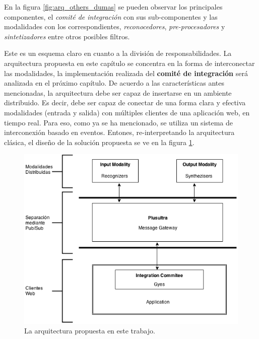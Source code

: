 En la figura \ref{fig:arq_others_dumas} se pueden observar los principales componentes, el \emph{comité de integración} con sus sub-componentes y las modalidades con los correspondientes, \emph{reconocedores}, \emph{pre-procesadores} y \emph{sintetizadores} entre otros posibles filtros.

Este es un esquema claro en cuanto a la división de responsabilidades. La arquitectura propuesta en este capítulo se concentra en la forma de interconectar las modalidades, la implementación realizada del \textbf{comité de integración} será analizada en el próximo capítulo.
De acuerdo a las características antes mencionadas, la arquitectura debe ser capaz de insertarse en un ambiente distribuido. Es decir, debe ser capaz de conectar de una forma clara y efectiva modalidades (entrada y salida) con múltiples clientes de una aplicación web, en tiempo real. Para eso, como ya se ha mencionado, se utiliza un sistema de interconexión basado en eventos. Entones, re-interpretando la arquitectura clásica, el diseño de la solución propuesta se ve en la figura \ref{fig:arq_dumas_plusultra}.

\begin{center}
  \begin{figure}[h]
    \includegraphics[scale=1,width=\textwidth]{gfx/Dumas_Plusultra}
    \caption{La arquitectura propuesta en este trabajo.}
    \label{fig:arq_dumas_plusultra}
  \end{figure}
\end{center}

